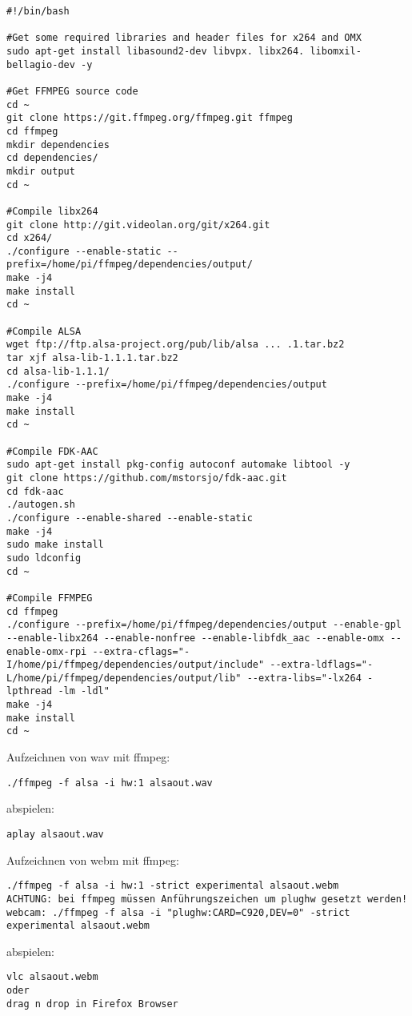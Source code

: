 \begin{verbatim}
#!/bin/bash

#Get some required libraries and header files for x264 and OMX
sudo apt-get install libasound2-dev libvpx. libx264. libomxil-bellagio-dev -y

#Get FFMPEG source code
cd ~
git clone https://git.ffmpeg.org/ffmpeg.git ffmpeg
cd ffmpeg
mkdir dependencies
cd dependencies/
mkdir output
cd ~

#Compile libx264
git clone http://git.videolan.org/git/x264.git
cd x264/
./configure --enable-static --prefix=/home/pi/ffmpeg/dependencies/output/
make -j4
make install
cd ~

#Compile ALSA
wget ftp://ftp.alsa-project.org/pub/lib/alsa ... .1.tar.bz2
tar xjf alsa-lib-1.1.1.tar.bz2
cd alsa-lib-1.1.1/
./configure --prefix=/home/pi/ffmpeg/dependencies/output
make -j4
make install
cd ~

#Compile FDK-AAC
sudo apt-get install pkg-config autoconf automake libtool -y
git clone https://github.com/mstorsjo/fdk-aac.git
cd fdk-aac
./autogen.sh
./configure --enable-shared --enable-static
make -j4
sudo make install
sudo ldconfig
cd ~

#Compile FFMPEG
cd ffmpeg
./configure --prefix=/home/pi/ffmpeg/dependencies/output --enable-gpl --enable-libx264 --enable-nonfree --enable-libfdk_aac --enable-omx --enable-omx-rpi --extra-cflags="-I/home/pi/ffmpeg/dependencies/output/include" --extra-ldflags="-L/home/pi/ffmpeg/dependencies/output/lib" --extra-libs="-lx264 -lpthread -lm -ldl"
make -j4
make install
cd ~

\end{verbatim}	
	
Aufzeichnen von wav mit ffmpeg:
\begin{verbatim}./ffmpeg -f alsa -i hw:1 alsaout.wav \end{verbatim}
abspielen:
\begin{verbatim}aplay alsaout.wav \end{verbatim}
Aufzeichnen von webm mit ffmpeg:
\begin{verbatim}
./ffmpeg -f alsa -i hw:1 -strict experimental alsaout.webm  
ACHTUNG: bei ffmpeg müssen Anführungszeichen um plughw gesetzt werden!
webcam: ./ffmpeg -f alsa -i "plughw:CARD=C920,DEV=0" -strict experimental alsaout.webm

\end{verbatim}
abspielen:
\begin{verbatim}
vlc alsaout.webm 
oder
drag n drop in Firefox Browser
\end{verbatim}

